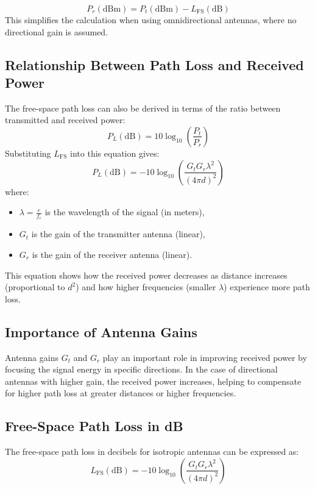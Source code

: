 \documentclass[a4paper,12pt]{book}
\begin{document}
	\[
	P_r (\text{dBm}) = P_t (\text{dBm}) - L_{\text{FS}} (\text{dB})
	\]
	This simplifies the calculation when using omnidirectional antennas, where no directional gain is assumed.
	
	\subsection{Relationship Between Path Loss and Received Power}
	
	The free-space path loss can also be derived in terms of the ratio between transmitted and received power:
	\[
	P_L (\text{dB}) = 10 \log_{10} \left( \frac{P_t}{P_r} \right)
	\]
	Substituting \(L_{\text{FS}}\) into this equation gives:
	\[
	P_L (\text{dB}) = -10 \log_{10} \left( \frac{G_t G_r \lambda^2}{(4 \pi d)^2} \right)
	\]
	where:
	\begin{itemize}
		\item \( \lambda = \frac{c}{f_c} \) is the wavelength of the signal (in meters),
		\item \( G_t \) is the gain of the transmitter antenna (linear),
		\item \( G_r \) is the gain of the receiver antenna (linear).
	\end{itemize}
	
	This equation shows how the received power decreases as distance increases (proportional to \(d^2\)) and how higher frequencies (smaller \(\lambda\)) experience more path loss.
	
	\subsection{Importance of Antenna Gains}
	
	Antenna gains \( G_t \) and \( G_r \) play an important role in improving received power by focusing the signal energy in specific directions. In the case of directional antennas with higher gain, the received power increases, helping to compensate for higher path loss at greater distances or higher frequencies.
	
	\subsection{Free-Space Path Loss in dB}
	
	The free-space path loss in decibels for isotropic antennas can be expressed as:
	\[
	L_{\text{FS}} (\text{dB}) = -10 \log_{10} \left( \frac{G_t G_r \lambda^2}{(4 \pi d)^2} \right)
	\]
	
\end{document}
